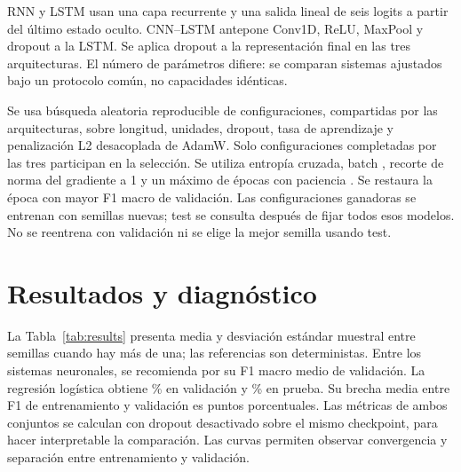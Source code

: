 \documentclass[conference]{IEEEtran}
\begin{document}
RNN y LSTM usan una capa recurrente y una salida lineal de seis logits a partir del último estado oculto. CNN--LSTM antepone Conv1D, ReLU, MaxPool y dropout a la LSTM. Se aplica dropout a la representación final en las tres arquitecturas. El número de parámetros difiere: se comparan sistemas ajustados bajo un protocolo común, no capacidades idénticas.

Se usa búsqueda aleatoria reproducible de \PlannedTrials{} configuraciones, compartidas por las arquitecturas, sobre longitud, unidades, dropout, tasa de aprendizaje y penalización L2 desacoplada de AdamW. Solo \Trials{} configuraciones completadas por las tres participan en la selección. \SearchNote{} Se utiliza entropía cruzada, batch \BatchSize{}, recorte de norma del gradiente a 1 y un máximo de \Epochs{} épocas con paciencia \Patience{}. Se restaura la época con mayor F1 macro de validación. Las configuraciones ganadoras se entrenan con \Seeds{} semillas nuevas; test se consulta después de fijar todos esos modelos. No se reentrena con validación ni se elige la mejor semilla usando test.

\begin{table}[t]
\caption{Configuraciones seleccionadas por validación. $T$: longitud, $h$: unidades, $p$: dropout, $\eta$: aprendizaje, $\lambda$: weight decay.}
\centering\scriptsize

\end{table}

\section{Resultados y diagnóstico}
La Tabla~\ref{tab:results} presenta media y desviación estándar muestral entre semillas cuando hay más de una; las referencias son deterministas. Entre los sistemas neuronales, se recomienda \Winner{} por su F1 macro medio de validación. La regresión logística obtiene \LogisticDev\% en validación y \LogisticTest\% en prueba. \BaselineComparison{} Su brecha media entre F1 de entrenamiento y validación es \Gap{} puntos porcentuales. Las métricas de ambos conjuntos se calculan con dropout desactivado sobre el mismo checkpoint, para hacer interpretable la comparación. Las curvas permiten observar convergencia y separación entre entrenamiento y validación.

\begin{table}[t]
\caption{Resultados en porcentaje. La variación entre semillas no es un intervalo de confianza poblacional.}
\label{tab:results}\centering\scriptsize

\end{table}
\end{document}
